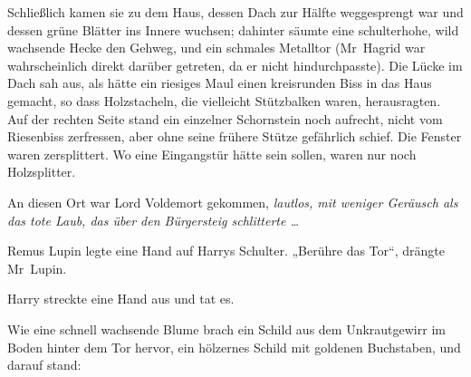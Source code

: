 Schließlich kamen sie zu dem Haus, dessen Dach zur Hälfte weggesprengt war und dessen grüne Blätter ins Innere wuchsen; dahinter säumte eine schulterhohe, wild wachsende Hecke den Gehweg, und ein schmales Metalltor (Mr~Hagrid war wahrscheinlich direkt darüber getreten, da er nicht hindurchpasste).
Die Lücke im Dach sah aus, als hätte ein riesiges Maul einen kreisrunden Biss in das Haus gemacht, so dass Holzstacheln, die vielleicht Stützbalken waren, herausragten. Auf der rechten Seite stand ein einzelner Schornstein noch aufrecht, nicht vom Riesenbiss zerfressen, aber ohne seine frühere Stütze gefährlich schief. Die Fenster waren zersplittert. Wo eine Eingangstür hätte sein sollen, waren nur noch Holzsplitter.

An diesen Ort war Lord Voldemort gekommen, \emph{lautlos, mit weniger Geräusch als das tote Laub, das über den Bürgersteig schlitterte …}

Remus Lupin legte eine Hand auf Harrys Schulter.
„Berühre das Tor“, drängte Mr~Lupin.

Harry streckte eine Hand aus und tat es.

Wie eine schnell wachsende Blume brach ein Schild aus dem Unkrautgewirr im Boden hinter dem Tor hervor, ein hölzernes Schild mit goldenen Buchstaben, und darauf stand:

